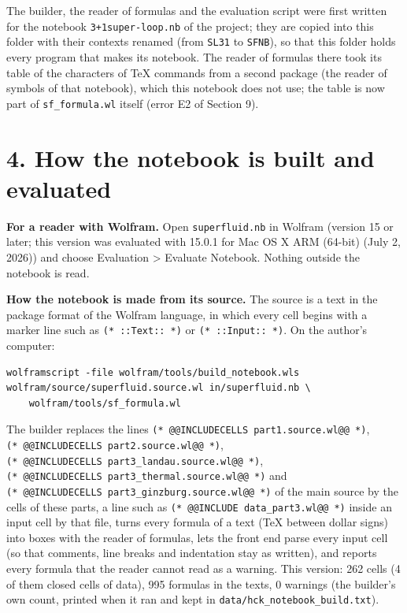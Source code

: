 \documentclass[
  10pt,
]{article}
\begin{document}
The builder, the reader of formulas and the evaluation script were first
written for the notebook \texttt{3+1super-loop.nb} of the project; they
are copied into this folder with their contexts renamed (from
\texttt{SL31} to \texttt{SFNB}), so that this folder holds every program
that makes its notebook. The reader of formulas there took its table of
the characters of TeX commands from a second package (the reader of
symbols of that notebook), which this notebook does not use; the table
is now part of \texttt{sf\_formula.wl} itself (error E2 of Section 9).

\hypertarget{how-the-notebook-is-built-and-evaluated}{%
\section{4. How the notebook is built and
evaluated}\label{how-the-notebook-is-built-and-evaluated}}

\textbf{For a reader with Wolfram.} Open \texttt{superfluid.nb} in
Wolfram (version 15 or later; this version was evaluated with 15.0.1 for
Mac OS X ARM (64-bit) (July 2, 2026)) and choose Evaluation
\textgreater{} Evaluate Notebook. Nothing outside the notebook is read.

\textbf{How the notebook is made from its source.} The source is a text
in the package format of the Wolfram language, in which every cell
begins with a marker line such as \texttt{(*\ ::Text::\ *)} or
\texttt{(*\ ::Input::\ *)}. On the author's computer:

\begin{verbatim}
wolframscript -file wolfram/tools/build_notebook.wls wolfram/source/superfluid.source.wl in/superfluid.nb \
    wolfram/tools/sf_formula.wl
\end{verbatim}

The builder replaces the lines
\texttt{(*\ @@INCLUDECELLS\ part1.source.wl@@\ *)},
\texttt{(*\ @@INCLUDECELLS\ part2.source.wl@@\ *)},
\texttt{(*\ @@INCLUDECELLS\ part3\_landau.source.wl@@\ *)},
\texttt{(*\ @@INCLUDECELLS\ part3\_thermal.source.wl@@\ *)} and
\texttt{(*\ @@INCLUDECELLS\ part3\_ginzburg.source.wl@@\ *)} of the main
source by the cells of these parts, a line such as
\texttt{(*\ @@INCLUDE\ data\_part3.wl@@\ *)} inside an input cell by
that file, turns every formula of a text (TeX between dollar signs) into
boxes with the reader of formulas, lets the front end parse every input
cell (so that comments, line breaks and indentation stay as written),
and reports every formula that the reader cannot read as a warning. This
version: 262 cells (4 of them closed cells of data), 995 formulas in the
texts, 0 warnings (the builder's own count, printed when it ran and kept
in \texttt{data/hck\_notebook\_build.txt}).
\end{document}
